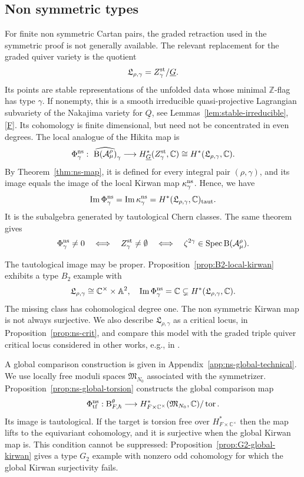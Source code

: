 \documentclass[11pt,reqno]{amsart}
\theoremstyle{definition}
\theoremstyle{remark}
\def\bbC{\mathbb C}
\def\bbZ{\mathbb Z}
\def\dG{\underline G}
\def\dQ{\underline Q}
\def\B{\mathrm B}
\def\calA{\mathcal A}
\def\Spec{\operatorname{Spec}}
\begin{document}
\subsection{Non symmetric types}
For finite non symmetric Cartan pairs, the graded retraction used in
the symmetric proof is not generally available. The relevant
replacement for the graded quiver variety is the quotient
\begin{align}\label{LRG1}
 \mathfrak L_{\rho,\gamma}
 =Z_\gamma^{\rm st}/\dG.
\end{align}
Its points are stable representations of the unfolded data whose
minimal $\bbZ$-flag has type $\gamma$. If nonempty, this is a
smooth irreducible quasi-projective Lagrangian subvariety of the
Nakajima variety for $\dQ$, see Lemmas~\ref{lem:stable-irreducible},
\ref{F}. Its cohomology is finite dimensional, but need not be
concentrated in even degrees. The local analogue of the Hikita map
is
\begin{align}\label{Phigammans}
 \Phi^{\rm ns}_\gamma:\ 
 \widehat{\B(\calA_\mu^\rho)}_\gamma
 \longrightarrow H^*_{\dG}(Z_\gamma^{\rm st},\bbC)
 \cong H^*(\mathfrak L_{\rho,\gamma},\bbC).
\end{align}
By Theorem~\ref{thm:ns-map}, it is defined for every integral pair
$(\rho,\gamma)$, and its image equals the image of the local Kirwan
map $\kappa^{\rm ns}_\gamma$. Hence, we have
\[
 \operatorname{Im}\Phi^{\rm ns}_\gamma
 =\operatorname{Im}\kappa^{\rm ns}_\gamma
 =H^*(\mathfrak L_{\rho,\gamma},\bbC)_{\rm taut}.
\]
It is the subalgebra generated by tautological Chern classes. 
The same theorem gives
\[
 \Phi^{\rm ns}_\gamma\ne0
 \quad\Longleftrightarrow\quad Z_\gamma^{\rm st}\ne\emptyset
 \quad\Longleftrightarrow\quad
 \zeta^{2\gamma}\in\Spec\B(\calA_\mu^\rho).
\]


The tautological image may be proper.
Proposition~\ref{prop:B2-local-kirwan} exhibits a type $B_2$
example with
\[
 \mathfrak L_{\rho,\gamma}\cong\bbC^\times\times\mathbb A^2,
 \quad
 \operatorname{Im}\Phi^{\rm ns}_\gamma=\bbC
 \subsetneq H^*(\mathfrak L_{\rho,\gamma},\bbC).
\]
The missing class has cohomological degree one. 
The non symmetric Kirwan map is not always
surjective. We also describe $\mathfrak L_{\rho,\gamma}$ as a
critical locus, in Proposition~\ref{prop:ns-crit}, and compare this
model with the graded triple quiver critical locus considered in other works, e.g., in  \cite{VV23}.

A global comparison construction is given in
Appendix~\ref{app:ns-global-technical}. We use locally free
moduli spaces $\mathfrak M_{N_0}$ associated with the symmetrizer.
Proposition~\ref{prop:ns-global-torsion} constructs the global comparison map
\[
 \Phi^{\rm ns}_{\rm tf}:\B^\theta_{F,\hbar}
 \longrightarrow
 H^*_{F\times\bbC^\times}(\mathfrak M_{N_0},\bbC)
 /\operatorname{tor}.
\]
Its image is tautological. If the target is torsion free over $H^*_{F\times\bbC^\times}$ then the map lifts to the equivariant
cohomology, and it is surjective when the global Kirwan
map is. This condition cannot be suppressed:
Proposition~\ref{prop:G2-global-kirwan} gives a type $G_2$
example with nonzero odd cohomology for which the global
Kirwan surjectivity fails.
\end{document}

